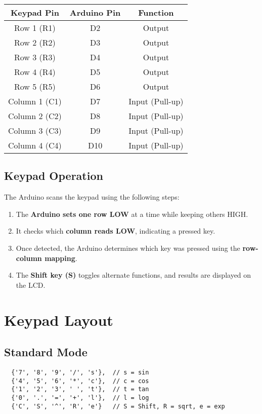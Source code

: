 \documentclass[journal,12pt,onecolumn]{IEEEtran}
\theoremstyle{remark}
\begin{document}
\begin{center}
\begin{tabular}{|c|c|c|}
\hline
\textbf{Keypad Pin} & \textbf{Arduino Pin} & \textbf{Function} \\
\hline
Row 1 (R1) & D2 & Output \\
Row 2 (R2) & D3 & Output \\
Row 3 (R3) & D4 & Output \\
Row 4 (R4) & D5 & Output \\
Row 5 (R5) & D6 & Output \\
Column 1 (C1) & D7 & Input (Pull-up) \\
Column 2 (C2) & D8 & Input (Pull-up) \\
Column 3 (C3) & D9 & Input (Pull-up) \\
Column 4 (C4) & D10 & Input (Pull-up) \\
\hline
\end{tabular}
\end{center}

\subsection{Keypad Operation}
The Arduino scans the keypad using the following steps:
\begin{enumerate}
    \item The \textbf{Arduino sets one row LOW} at a time while keeping others HIGH.
    \item It checks which \textbf{column reads LOW}, indicating a pressed key.
    \item Once detected, the Arduino determines which key was pressed using the \textbf{row-column mapping}.
    \item The \textbf{Shift key (S)} toggles alternate functions, and results are displayed on the LCD.
\end{enumerate}

\section{Keypad Layout}
\subsection{Standard Mode}
\begin{verbatim}
  {'7', '8', '9', '/', 's'},  // s = sin
  {'4', '5', '6', '*', 'c'},  // c = cos
  {'1', '2', '3', ' ', 't'},  // t = tan
  {'0', '.', '=', '+', 'l'},  // l = log
  {'C', 'S', '^', 'R', 'e'}   // S = Shift, R = sqrt, e = exp
\end{verbatim}
\end{document}
